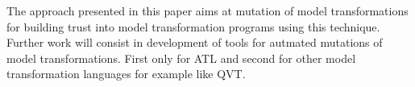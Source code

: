\documentclass{llncs}
\begin{document}
The approach presented in this paper aims at mutation of model transformations for building trust into model transformation programs using this technique. Further work will consist in development of tools for autmated mutations of model transformations. First only for ATL and second for other model transformation languages for example like QVT.

\newpage


\end{document}
